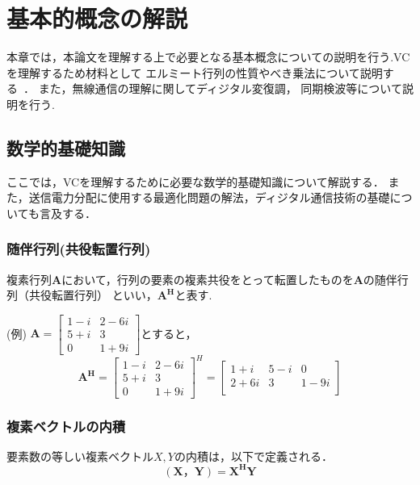 \chapter{基本的概念の解説}
本章では，本論文を理解する上で必要となる基本概念についての説明を行う.VCを理解するため材料として
エルミート行列の性質やべき乗法について説明する~\cite{strang}． また，無線通信の理解に関してディジタル変復調，
同期検波等について説明を行う.

\section{数学的基礎知識}
ここでは，VCを理解するために必要な数学的基礎知識について解説する．
また，送信電力分配に使用する最適化問題の解法，ディジタル通信技術の基礎についても言及する．

\subsection{随伴行列(共役転置行列)}
複素行列$\bm{A}$において，行列の要素の複素共役をとって転置したものを$\bm{A}$の随伴行列（共役転置行列）
といい，$\bm{A^H}$と表す.

(例)\quad
$
  \bm{A} = \left[
    \begin{array}{cc}
      1-i & 2-6i \\
      5+i & 3 \\
      0 & 1+9i
    \end{array}
  \right]
$とすると，
\vspace{1mm}
\begin{equation}
    \bm{A^H} = \left[
        \begin{array}{cc}
            1-i & 2-6i \\
            5+i & 3 \\
            0 & 1+9i
        \end{array}
    \right]^H 
    = \left[
        \begin{array}{ccc}
            1+i & 5-i & 0 \\
            2+6i & 3 & 1-9i \\
        \end{array}
    \right] \nonumber
\end{equation}

\subsection{複素ベクトルの内積}
要素数の等しい複素ベクトル$X,Y$の内積は，以下で定義される．
\begin{equation}
    (\bm{X}，\bm{Y}) = \bm{X^HY}
\end{equation}


